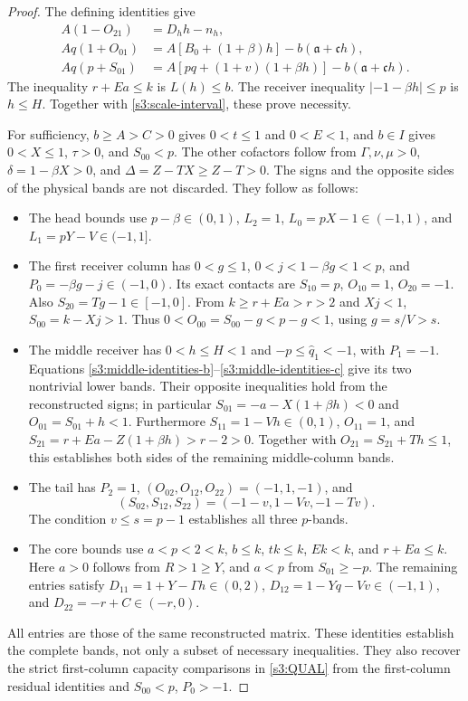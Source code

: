 \documentclass[11pt,reqno]{amsart}
\theoremstyle{definition}
\theoremstyle{remark}
\begin{document}
\begin{proof}
The defining identities give
\begin{align}
 A(1-O_{21})&=D_hh-n_h,\label{s3:middle-identities-a}\\
 Aq(1+O_{01})&=A[B_0+(1+\beta)h]
                  -b(\mathfrak a+\mathfrak c h),\label{s3:middle-identities-b}\\
 Aq(p+S_{01})&=A[pq+(1+v)(1+\beta h)]
                  -b(\mathfrak a+\mathfrak c h).\label{s3:middle-identities-c}
\end{align}
The inequality \(r+Ea\le k\) is \(L(h)\le b\).
The receiver inequality \(|-1-\beta h|\le p\) is \(h\le H\).
Together with \eqref{s3:scale-interval}, these prove necessity.

For sufficiency, \(b\ge A>C>0\) gives \(0<t\le1\) and
\(0<E<1\), and \(b\in I\) gives \(0<X\le1\),
\(\tau>0\), and \(S_{00}<p\). The other cofactors follow from
\(\Gamma,\nu,\mu>0\),
\(\delta=1-\beta X>0\), and
\(\Delta=Z-TX\ge Z-T>0\). The signs and the opposite sides of
the physical bands are not discarded. They follow as follows:
\begin{itemize}
\item The head bounds use \(p-\beta\in(0,1)\),
 \(L_2=1\), \(L_0=pX-1\in(-1,1)\), and
 \(L_1=pY-V\in(-1,1]\).
\item The first receiver column has \(0<g\le1\),
 \(0<j<1-\beta g<1<p\), and
 \(P_0=-\beta g-j\in(-1,0)\).
 Its exact contacts are \(S_{10}=p\), \(O_{10}=1\),
 \(O_{20}=-1\). Also \(S_{20}=Tg-1\in[-1,0]\).
 From \(k\ge r+Ea>r>2\) and \(Xj<1\),
 \(S_{00}=k-Xj>1\). Thus
 \(0<O_{00}=S_{00}-g<p-g<1\), using \(g=s/V>s\).
\item The middle receiver has \(0<h\le H<1\) and
 \(-p\le\widehat q_1<-1\), with \(P_1=-1\).
 Equations \eqref{s3:middle-identities-b}--\eqref{s3:middle-identities-c}
 give its two nontrivial lower bands. Their opposite inequalities
 hold from the reconstructed signs; in particular
 \(S_{01}=-a-X(1+\beta h)<0\) and
 \(O_{01}=S_{01}+h<1\).
 Furthermore \(S_{11}=1-Vh\in(0,1)\), \(O_{11}=1\),
 and \(S_{21}=r+Ea-Z(1+\beta h)>r-2>0\).
 Together with \(O_{21}=S_{21}+Th\le1\), this establishes both sides
 of the remaining middle-column bands.
\item The tail has \(P_2=1\),
 \((O_{02},O_{12},O_{22})=(-1,1,-1)\), and
 \[ (S_{02},S_{12},S_{22})=(-1-v,1-Vv,-1-Tv). \]
 The condition \(v\le s=p-1\) establishes all three \(p\)-bands.
\item The core bounds use \(a<p<2<k\), \(b\le k\),
 \(tk\le k\), \(Ek<k\), and \(r+Ea\le k\).
 Here \(a>0\) follows from \(R>1\ge Y\), and
 \(a<p\) from \(S_{01}\ge-p\).
 The remaining entries satisfy
 \(D_{11}=1+Y-\Gamma h\in(0,2)\),
 \(D_{12}=1-Yq-Vv\in(-1,1)\), and
 \(D_{22}=-r+C\in(-r,0)\).
\end{itemize}
All entries are those of the same reconstructed matrix. These
identities establish the complete bands, not only a subset of necessary
inequalities. They also recover the strict first-column capacity
comparisons in \eqref{s3:QUAL} from the first-column residual
identities and \(S_{00}<p\), \(P_0>-1\).
\end{proof}
\end{document}
